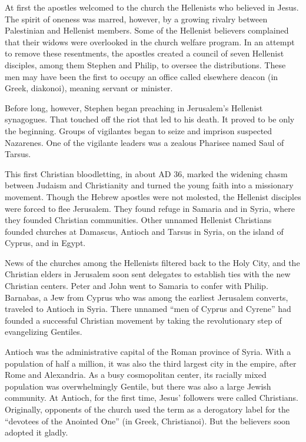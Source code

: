 At first the apostles welcomed to the church the Hellenists who believed in Jesus. The spirit of
oneness was marred, however, by a growing rivalry between Palestinian and Hellenist members. Some of
the Hellenist believers complained that their widows were overlooked in the church welfare program.
In an attempt to remove these resentments, the apostles created a council of seven Hellenist
disciples, among them Stephen and Philip, to oversee the distributions. These men may have been the
first to occupy an office called elsewhere deacon (in Greek, diakonoi), meaning servant or minister.

Before long, however, Stephen began preaching in Jerusalem’s Hellenist synagogues. That touched off
the riot that led to his death. It proved to be only the beginning. Groups of vigilantes began to
seize and imprison suspected Nazarenes. One of the vigilante leaders was a zealous Pharisee named
Saul of Tarsus.

This first Christian bloodletting, in about AD 36, marked the widening chasm between Judaism and
Christianity and turned the young faith into a missionary movement. Though the Hebrew apostles were
not molested, the Hellenist disciples were forced to flee Jerusalem. They found refuge in Samaria
and in Syria, where they founded Christian communities. Other unnamed Hellenist Christians founded
churches at Damascus, Antioch and Tarsus in Syria, on the island of Cyprus, and in Egypt.

News of the churches among the Hellenists filtered back to the Holy City, and the Christian elders
in Jerusalem soon sent delegates to establish ties with the new Christian centers. Peter and John
went to Samaria to confer with Philip. Barnabas, a Jew from Cyprus who was among the earliest
Jerusalem converts, traveled to Antioch in Syria. There unnamed “men of Cyprus and Cyrene” had
founded a successful Christian movement by taking the revolutionary step of evangelizing Gentiles.

Antioch was the administrative capital of the Roman province of Syria. With a population of half a
million, it was also the third largest city in the empire, after Rome and Alexandria. As a busy
cosmopolitan center, its racially mixed population was overwhelmingly Gentile, but there was also a
large Jewish community. At Antioch, for the first time, Jesus’ followers were called Christians.
Originally, opponents of the church used the term as a derogatory label for the “devotees of the
Anointed One” (in Greek, Christianoi). But the believers soon adopted it gladly.

